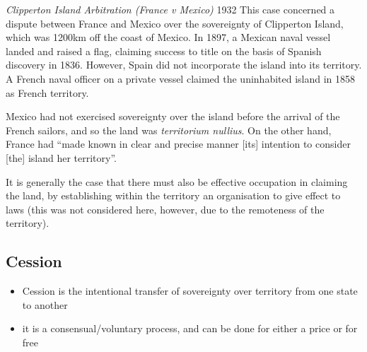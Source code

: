 \begin{casedetails}{\textit{Clipperton Island Arbitration (France v Mexico)} 1932}
    \flushleft
    This case concerned a dispute between France and Mexico over the sovereignty of Clipperton Island, which was 1200km off the coast of Mexico. In 1897, a Mexican naval vessel landed and raised a flag, claiming success to title on the basis of Spanish discovery in 1836. However, Spain did not incorporate the island into its territory. A French naval officer on a private vessel claimed the uninhabited island in 1858 as French territory.

    \vspace{\baselineskip}

    Mexico had not exercised sovereignty over the island before the arrival of the French sailors, and so the land was \textit{territorium nullius}. On the other hand, France had ``made known in clear and precise manner [its] intention to consider [the] island her territory''.
    
    \vspace{\baselineskip}

    It is generally the case that there must also be effective occupation in claiming the land, by establishing within the territory an organisation to give effect to laws (this was not considered here, however, due to the remoteness of the territory).
\end{casedetails}

\subsection{Cession}
\begin{itemize}
    \item Cession is the intentional transfer of sovereignty over territory from one state to another
    \item it is a consensual/voluntary process, and can be done for either a price or for free
\end{itemize}

